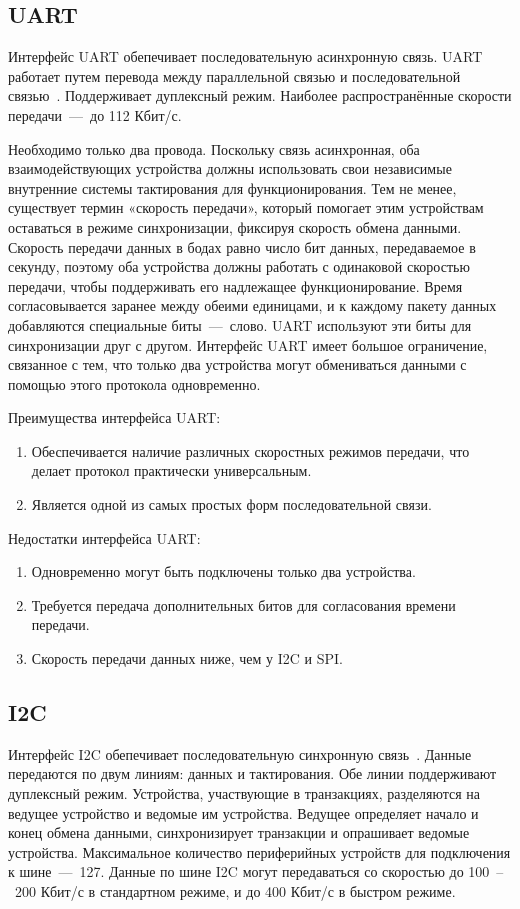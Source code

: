\subsection{UART}
Интерфейс UART обепечивает последовательную асинхронную связь. UART работает путем перевода между параллельной связью и последовательной связью~\cite{bib7}. Поддерживает дуплексный режим. Наиболее распространённые скорости передачи~---~до 112 Кбит/с.

Необходимо только два провода. Поскольку связь асинхронная, оба взаимодействующих устройства должны использовать свои независимые внутренние системы тактирования для функционирования. Тем не менее, существует термин «скорость передачи», который помогает этим устройствам оставаться в режиме синхронизации, фиксируя скорость обмена данными. Скорость передачи данных в бодах равно число бит данных, передаваемое в секунду, поэтому оба устройства должны работать с одинаковой скоростью передачи, чтобы поддерживать его надлежащее функционирование. Время согласовывается заранее между обеими единицами, и к каждому пакету данных добавляются специальные биты~---~слово. UART используют эти биты для синхронизации друг с другом. Интерфейс UART имеет большое ограничение, связанное с тем, что только два устройства могут обмениваться данными с помощью этого протокола одновременно.

Преимущества интерфейса UART:
\begin{enumerate}
	\item Обеспечивается наличие различных скоростных режимов передачи, что делает протокол практически универсальным.
	\item Является одной из самых простых форм последовательной связи.
\end{enumerate}

Недостатки интерфейса UART:
\begin{enumerate}
	\item Одновременно могут быть подключены только два устройства.
	\item Требуется передача дополнительных битов для согласования времени передачи.
	\item Скорость передачи данных ниже, чем у I2C и SPI.
\end{enumerate}


\subsection{I2C}
Интерфейс I2C обепечивает последовательную синхронную связь~\cite{bib6}. Данные передаются по двум линиям: данных и тактирования. Обе линии поддерживают дуплексный режим. Устройства, участвующие в транзакциях, разделяются на ведущее устройство и ведомые им устройства. Ведущее определяет начало и конец обмена данными, синхронизирует транзакции и опрашивает ведомые устройства. Максимальное количество периферийных устройств для подключения к шине~---~127. Данные по шине I2C могут передаваться со скоростью до 100~--~200 Кбит/с в стандартном режиме, и до 400 Кбит/с в быстром режиме.

